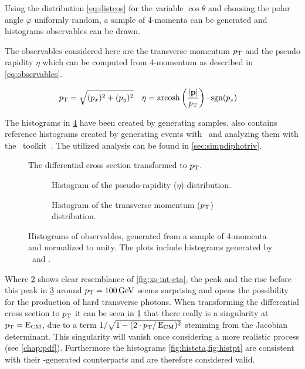 Using the distribution \cref{eq:distcos} for the variable
\(\cos\theta\) and choosing the polar angle \(\varphi\) uniformly
random, a sample of 4-momenta can be generated and histograms
observables can be drawn.

The observables considered here are the transverse momentum \(p_\mathrm{T}\)
and the pseudo rapidity \(\eta\) which can be computed from 4-momentum
as described in \cref{eq:observables}.

\begin{align}
  \label{eq:observables}
  p_\mathrm{T} &= \sqrt{(p_x)^2+(p_y)^2} & \eta &=
                                         \operatorname{arcosh}\qty(\frac{\abs{\vb{p}}}{p_\mathrm{T}})\cdot\operatorname{sgn}(p_z)
\end{align}

The histograms in \cref{fig:histos} have been created by generating
 samples.  also
contains reference histograms created by generating events with
\sherpa\ and analyzing them with the \rivet\
toolkit~\cite{Bierlich:2019rhm}. The utilized analysis can be found
in \cref{sec:simpdiphotriv}.

\begin{figure}[ht]
  \centering {}
  \caption{\label{fig:diff-xs-pt} The differential cross section
    transformed to \(p_\mathrm{T}\).}
\end{figure}

\begin{figure}[p]
  \centering

  \begin{subfigure}[b]{\textwidth}
    \centering {}
    \caption{\label{fig:histeta} Histogram of the pseudo-rapidity
      (\(\eta\)) distribution.}
  \end{subfigure}
  \begin{subfigure}[b]{\textwidth}
    \centering {}
    \caption{\label{fig:histpt} Histogram of the transverse momentum
      (\(p_\mathrm{T}\)) distribution.}
  \end{subfigure}
  \caption{\label{fig:histos} Histograms of observables, generated
    from a sample of 4-momenta and normalized to unity. The plots
    include histograms generated by \sherpa\ and \rivet.}
\end{figure}

Where \cref{fig:histeta} shows clear resemblance of
\cref{fig:xs-int-eta}, the peak and the rise before this peak in
\cref{fig:histpt} around \(p_\mathrm{T}=\SI{100}{\giga\electronvolt}\) seems
surprising and opens the possibility for the production of hard
transverse photons. When transforming the differential cross section
to \(p_\mathrm{T}\) it can be seen in \cref{fig:diff-xs-pt} that there really
is a singularity at \(p_\mathrm{T} = \operatorname{E_{\text{CM}}}\), due to a term
\(1/\sqrt{1-(2\cdot p_\mathrm{T}/\operatorname{E_{\text{CM}}})^2}\) stemming from the Jacobian
determinant.  This singularity will vanish once considering a more
realistic process (see \cref{chap:pdf}). Furthermore the histograms
\cref{fig:histeta,fig:histpt} are consistent with their
\rivet-generated counterparts and are therefore considered valid.

